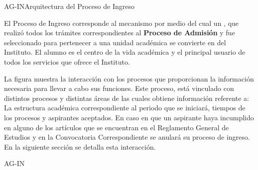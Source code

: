 



%		

\begin{Arquitectura}{AG-IN}{Arquitectura del Proceso de Ingreso} {
		
	El Proceso de Ingreso corresponde al mecanismo por medio del cual un , que realizó todos los trámites correspondientes al \textbf{Proceso de Admisión} y fue seleccionado para pertenecer a una unidad académica se convierte en  del Instituto. El alumno es el centro de la vida académica y el principal usuario de todos los servicios que ofrece el Instituto. 
	
	La figura  muestra la interacción con los procesos que proporcionan la información necesaria para llevar a cabo sus funciones. Este proceso, está vinculado con distintos procesos y distintas áreas de las cuales obtiene información referente a: La estructura académica correspondiente al periodo que se iniciará, tiempos de los procesos y aspirantes aceptados. En caso en que un aspirante haya incumplido en alguno de los artículos que se encuentran en el Reglamento General de Estudios y en la Convocatoria Correspondiente se anulará su proceso de ingreso. En la siguiente sección se detalla esta interacción.
	}{AG-IN}

\end{Arquitectura}

